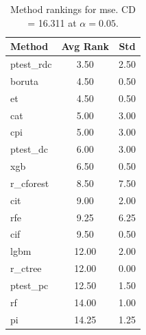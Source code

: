 \begin{table}[h]
\centering
\caption{Method rankings for mse. CD = 16.311 at $\alpha=0.05$.}
\label{tab:ranks_mse}
\begin{tabular}{lcc}
\toprule
Method & Avg Rank & Std \\
\midrule
ptest_rdc & 3.50 & 2.50 \\
boruta & 4.50 & 0.50 \\
et & 4.50 & 0.50 \\
cat & 5.00 & 3.00 \\
cpi & 5.00 & 3.00 \\
ptest_dc & 6.00 & 3.00 \\
xgb & 6.50 & 0.50 \\
r_cforest & 8.50 & 7.50 \\
cit & 9.00 & 2.00 \\
rfe & 9.25 & 6.25 \\
cif & 9.50 & 0.50 \\
lgbm & 12.00 & 2.00 \\
r_ctree & 12.00 & 0.00 \\
ptest_pc & 12.50 & 1.50 \\
rf & 14.00 & 1.00 \\
pi & 14.25 & 1.25 \\
\bottomrule
\end{tabular}
\end{table}